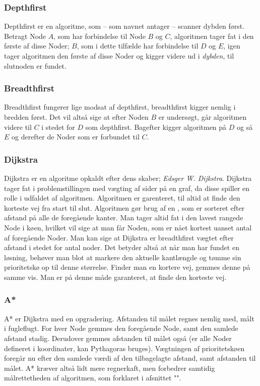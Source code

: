 \documentclass[a4paper, 12pt]{article}
\begin{document}
\subsubsection{Depthfirst}
Depthfirst er en algoritme, som -- som navnet antager -- scanner dybden først. Betragt Node $A$, som har forbindelse til Node $B$ og $C$, algoritmen tager fat i den første af disse Noder; $B$, som i dette tilfælde har forbindelse til $D$ og $E$, igen tager algoritmen den første af disse Noder og kigger videre ud i \textit{dybden}, til slutnoden er fundet.
\subsubsection{Breadthfirst}
Breadthfirst fungerer lige modsat af depthfirst, breadthfirst kigger nemlig i bredden først. Det vil altså sige at efter Noden $B$ er undersøgt, går algoritmen videre til $C$ i stedet for $D$ som depthfirst. Bagefter kigger algoritmen på $D$ og så $E$ og derefter de Noder som er forbundet til $C$.
\subsubsection{Dijkstra}\label{subsubsec:dijk}
Dijkstra er en algoritme opkaldt efter dens skaber; \textit{Edsger W. Dijkstra}.\cite{dijkstra} Dijkstra tager fat i problemstillingen med vægting af sider på en graf, da disse spiller en rolle i udfaldet af algoritmen. Algoritmen er garenteret, til altid at finde den korteste vej fra start til slut. Algoritmen gør brug af en , som er sorteret efter afstand på alle de foregående kanter. Man tager altid fat i den lavest rangede Node i køen, hvilket vil sige at man får Noden, som er nået kortest uanset antal af foregående Noder. Man kan sige at Dijkstra er breadthfirst vægtet efter afstand i stedet for antal noder. Det betyder altså at når man har fundet en løsning, behøver man blot at markere den aktuelle kantlængde og tømme sin prioritetskø op til denne størrelse. Finder man en kortere vej, gemmes denne på samme vis. Man er på denne måde garanteret, at finde den korteste vej.
\subsubsection{A*}
A* er Dijkstra med en opgradering. Afstanden til målet regnes nemlig med, målt i fugleflugt. For hver Node gemmes den foregående Node, samt den samlede afstand stadig. Derudover gemmes afstanden til målet også (er alle Noder defineret i koordinater, kan Pythagoras bruges). Vægtningen af prioritetskøen foregår nu efter den samlede værdi af den tilbagelagte afstand, samt afstanden til målet. A* kræver altså lidt mere regnerkaft, men forbedrer samtidig målrettetheden af algoritmen, som forklaret i afsnittet "".
\end{document}
